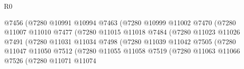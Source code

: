 \begin{lexlean}{R0}
\begin{coremodule}
                                          @7456
                                          (@7280
                                            @10991
                                            @10994
                                            @7463
                                            (@7280
                                              @10999
                                              @11002
                                              @7470
                                              (@7280
                                                @11007
                                                @11010
                                                @7477
                                                (@7280
                                                  @11015
                                                  @11018
                                                  @7484
                                                  (@7280
                                                    @11023
                                                    @11026
                                                    @7491
                                                    (@7280
                                                      @11031
                                                      @11034
                                                      @7498
                                                      (@7280
                                                        @11039
                                                        @11042
                                                        @7505
                                                        (@7280
                                                          @11047
                                                          @11050
                                                          @7512
                                                          (@7280
                                                            @11055
                                                            @11058
                                                            @7519
                                                            (@7280
                                                              @11063
                                                              @11066
                                                              @7526
                                                              (@7280
                                                                @11071
                                                                @11074

\end{coremodule}
\end{lexlean}
